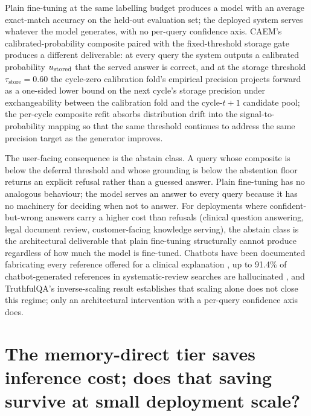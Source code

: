 Plain fine-tuning at the same labelling budget produces a model with an average exact-match accuracy on the held-out evaluation set; the deployed system serves whatever the model generates, with no per-query confidence axis. CAEM's calibrated-probability composite paired with the fixed-threshold storage gate produces a different deliverable: at every query the system outputs a calibrated probability $u_{\text{stored}}$ that the served answer is correct, and at the storage threshold $\tau_{\text{store}} = 0.60$ the cycle-zero calibration fold's empirical precision projects forward as a one-sided lower bound on the next cycle's storage precision under exchangeability between the calibration fold and the cycle-$t+1$ candidate pool; the per-cycle composite refit absorbs distribution drift into the signal-to-probability mapping so that the same threshold continues to address the same precision target as the generator improves.

The user-facing consequence is the abstain class. A query whose composite is below the deferral threshold and whose grounding is below the abstention floor returns an explicit refusal rather than a guessed answer. Plain fine-tuning has no analogous behaviour; the model serves an answer to every query because it has no machinery for deciding when not to answer. For deployments where confident-but-wrong answers carry a higher cost than refusals (clinical question answering, legal document review, customer-facing knowledge serving), the abstain class is the architectural deliverable that plain fine-tuning structurally cannot produce regardless of how much the model is fine-tuned. Chatbots have been documented fabricating every reference offered for a clinical explanation \cite{alkaissi2023artificial}, up to 91.4\% of chatbot-generated references in systematic-review searches are hallucinated \cite{info:doi/10.2196/53164}, and TruthfulQA's inverse-scaling result \cite{lin-etal-2022-truthfulqa} establishes that scaling alone does not close this regime; only an architectural intervention with a per-query confidence axis does.


\section[Memory-direct tier at scale]{The memory-direct tier saves inference cost; does that saving survive at small deployment scale?}
\label{app:qa-memory-direct}

